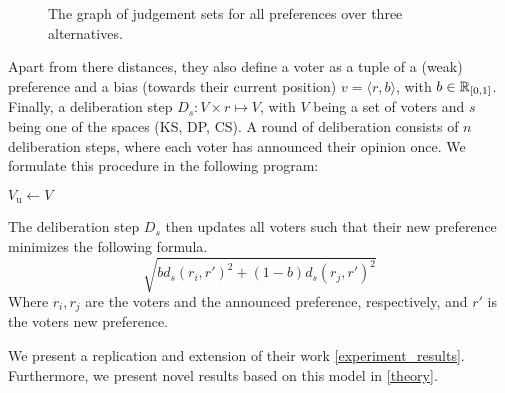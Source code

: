 \begin{figure}
	\caption{The graph of judgement sets for all preferences over three alternatives.}
	\label{figure:DPDistance}
\end{figure}

Apart from there distances, they also define a voter as a tuple of a (weak) preference and a bias (towards their current position) \(v = \langle r, b \rangle \), with \( b \in \mathbb{R}_{[0,1]}\). Finally, a deliberation step \(D_{s} : V \times r \mapsto V\), with $V$ being a set of voters and $s$ being one of the spaces (KS, DP, CS). A round of deliberation consists of $n$ deliberation steps, where each voter has announced their opinion once. We formulate this procedure in the following program:
\IncMargin{1em}
\begin{algorithm}

	\BlankLine

	$V_{\text{u}} \gets V$ \\


\end{algorithm}
\DecMargin{1em}

The deliberation step $D_s$ then updates all voters such that their new preference  minimizes the following formula.
\begin{equation}
	\sqrt{
		b d_s(r_i, r')^2 + (1-b)d_s(r_j, r')^2
	}
	\label{eq:deliberation_step_formula}
\end{equation}
Where $r_i, r_j$ are the voters and the announced preference, respectively, and $r'$ is the voters new preference.

We present a replication and extension of their work \cref{experiment_results}. Furthermore, we present novel results based on this model in \cref{theory}.

